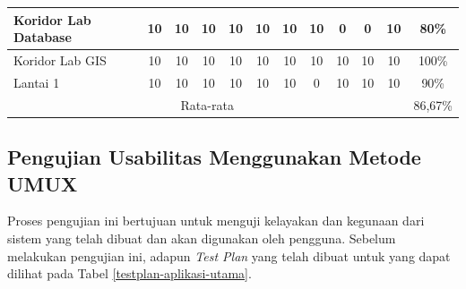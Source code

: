 \begin{enumerate}
\begin{table}[H]
\begin{tabular}{|lccccccccccc|}
			      \multicolumn{1}{|l|}{Koridor Lab Database}                            & \multicolumn{1}{c|}{10}                                 & \multicolumn{1}{c|}{10} & \multicolumn{1}{c|}{10} & \multicolumn{1}{c|}{10} & \multicolumn{1}{c|}{10} & \multicolumn{1}{c|}{10} & \multicolumn{1}{c|}{10} & \multicolumn{1}{c|}{0}  & \multicolumn{1}{c|}{0}  & \multicolumn{1}{c|}{10} & 80\%  \\ \hline
			      \multicolumn{1}{|l|}{Koridor Lab GIS}                                 & \multicolumn{1}{c|}{10}                                 & \multicolumn{1}{c|}{10} & \multicolumn{1}{c|}{10} & \multicolumn{1}{c|}{10} & \multicolumn{1}{c|}{10} & \multicolumn{1}{c|}{10} & \multicolumn{1}{c|}{10} & \multicolumn{1}{c|}{10} & \multicolumn{1}{c|}{10} & \multicolumn{1}{c|}{10} & 100\% \\ \hline
			      \multicolumn{1}{|l|}{Lantai 1}                                        & \multicolumn{1}{c|}{10}                                 & \multicolumn{1}{c|}{10} & \multicolumn{1}{c|}{10} & \multicolumn{1}{c|}{10} & \multicolumn{1}{c|}{10} & \multicolumn{1}{c|}{10} & \multicolumn{1}{c|}{0}  & \multicolumn{1}{c|}{10} & \multicolumn{1}{c|}{10} & \multicolumn{1}{c|}{10} & 90\%  \\ \hline
			      \multicolumn{11}{|c|}{Rata-rata}                                      & 86,67\%                                                                                                                                                                                                                                                                                                   \\ \hline
		      \end{tabular}
	      \end{table}

\end{enumerate}

\subsection{Pengujian Usabilitas Menggunakan Metode UMUX}
\par Proses pengujian ini bertujuan untuk menguji kelayakan dan kegunaan dari sistem yang telah dibuat dan akan digunakan oleh pengguna. Sebelum melakukan pengujian ini, adapun \textit{Test Plan} yang telah dibuat untuk yang dapat dilihat pada Tabel \ref{testplan-aplikasi-utama}.

